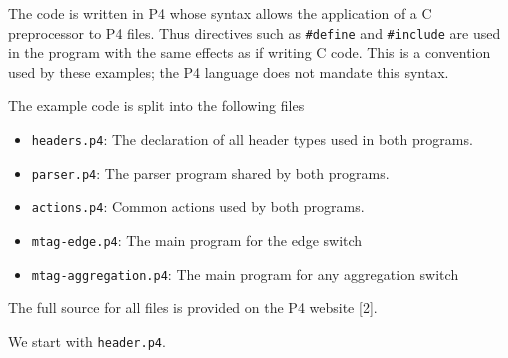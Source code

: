 \documentclass[12pt]{article}
\begin{document}
The code is written in P4 whose syntax allows the application of a C preprocessor 
to P4 files. Thus directives such as \texttt{\#define} and \texttt{\#include} are used in 
the program with the same effects as if writing C code. This is a convention 
used by these examples; the P4 language does not mandate this syntax.

The example code is split into the following files

\begin{itemize}
\item
\texttt{headers.p4}: The declaration of all header types used in both programs.
\item
\texttt{parser.p4}: The parser program shared by both programs.
\item
\texttt{actions.p4}: Common actions used by both programs.
\item
\texttt{mtag-edge.p4}: The main program for the edge switch
\item
\texttt{mtag-aggregation.p4}: The main program for any aggregation switch
\end{itemize}

The full source for all files is provided on the P4 website [2].

We start with \texttt{header.p4}. 

\end{document}
